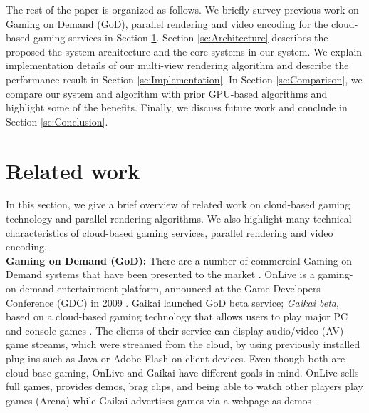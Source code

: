 \documentclass[conference]{IEEEtran}
\begin{document}
    The rest of the paper is organized as follows.
    We briefly survey previous work on Gaming on Demand (GoD), parallel rendering and video encoding for the cloud-based gaming services in Section \ref{sc:RelatedWork}.
    Section \ref{sc:Architecture} describes the proposed the system architecture and the core systems in our system.
    We explain implementation details of our multi-view rendering algorithm and describe the performance result in Section \ref{sc:Implementation}.
    In Section \ref{sc:Comparison}, we compare our system and algorithm with prior GPU-based algorithms and highlight some of the benefits.
    Finally, we discuss future work and conclude in Section \ref{sc:Conclusion}.

    \section{Related work}
    \label{sc:RelatedWork}
    In this section, we give a brief overview of related work on cloud-based gaming technology and parallel rendering algorithms.
    We also highlight many technical characteristics of cloud-based gaming services, parallel rendering and video encoding.\\

    \noindent
    \textbf{Gaming on Demand (GoD):}
    There are a number of commercial Gaming on Demand systems that have been presented to the market \cite{Jurgelionis:2010}.
   OnLive is a gaming-on-demand entertainment platform, announced at the Game Developers Conference (GDC) in 2009 \cite{Perlman:2009}.
   Gaikai launched GoD beta service; \emph{Gaikai beta}, based on a cloud-based gaming technology that allows users to play major PC and console games \cite{Gaikai:2010}.
   The clients of their service can display audio/video (AV) game streams, which were streamed from the cloud, by using previously installed plug-ins such as Java or Adobe Flash on client devices.
   Even though both are cloud base gaming, OnLive and Gaikai have different goals in mind.
   OnLive sells full games, provides demos, brag clips, and being able to watch other players play games (Arena) while Gaikai advertises games via a webpage as demos \cite{Perlman:2009}.
\end{document}
